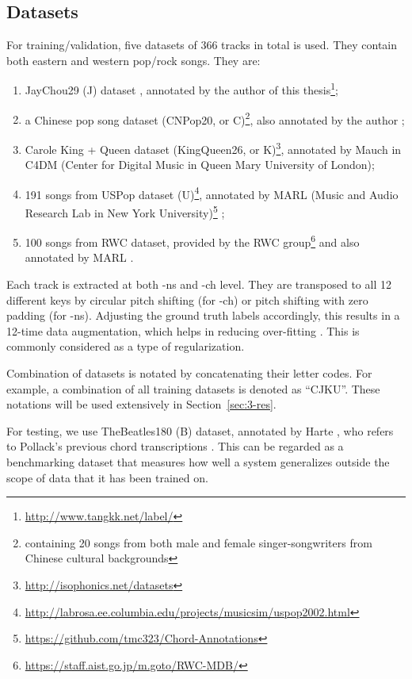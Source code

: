 \subsection{Datasets}
For training/validation, five datasets of 366 tracks in total is used. They contain both eastern and western pop/rock songs. They are:
\begin{enumerate}
\item JayChou29 (J) dataset \cite{deng2016chord}, annotated by the author of this thesis\footnote{\url{http://www.tangkk.net/label/}};
\item a Chinese pop song dataset (CNPop20, or C)\footnote{containing 20 songs from both male and female singer-songwriters from Chinese cultural backgrounds}, also annotated by the author \cite{deng2016hybrid};
\item Carole King + Queen dataset (KingQueen26, or K)\footnote{\url{http://isophonics.net/datasets}}, annotated by Mauch \cite{mauch2009omras2} in C4DM (Center for Digital Music in Queen Mary University of London);
\item 191 songs from USPop dataset (U)\footnote{\url{http://labrosa.ee.columbia.edu/projects/musicsim/uspop2002.html}}, annotated by MARL (Music and Audio Research Lab in New York University)\footnote{\url{https://github.com/tmc323/Chord-Annotations}} \cite{cho2014improved};
\item 100 songs from RWC dataset, provided by the RWC group\footnote{\url{https://staff.aist.go.jp/m.goto/RWC-MDB/}} and also annotated by MARL \cite{cho2014improved}.
\end{enumerate}


Each track is extracted at both -ns and -ch level. They are transposed to all 12 different keys by circular pitch shifting (for -ch) or pitch shifting with zero padding (for -ns). Adjusting the ground truth labels accordingly, this results in a 12-time data augmentation, which helps in reducing over-fitting \cite{cho2014improved,humphrey2015exploration}. This is commonly considered as a type of regularization.

Combination of datasets is notated by concatenating their letter codes. For example, a combination of all training datasets is denoted as ``CJKU''. These notations will be used extensively in Section~\ref{sec:3-res}.

For testing, we use TheBeatles180 (B) dataset, annotated by Harte \cite{harte2010towards}, who refers to Pollack's previous chord transcriptions \cite{pollack2000notes}. This can be regarded as a benchmarking dataset that measures how well a system generalizes outside the scope of data that it has been trained on.

